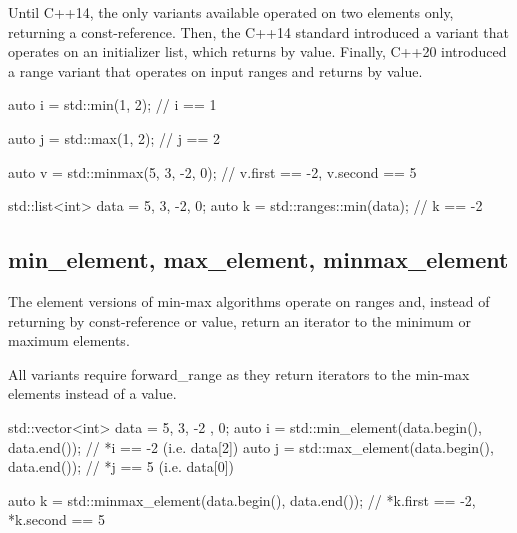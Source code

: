 

Until C++14, the only variants available operated on two elements only, returning a const-reference. Then, the C++14 standard introduced a variant that operates on an initializer list, which returns by value. Finally, C++20 introduced a range variant that operates on input ranges and returns by value.

\begin{box-note}
\begin{cppcode}
auto i = std::min(1, 2);
// i == 1

auto j = std::max(1, 2);
// j == 2

auto v = std::minmax({5, 3, -2, 0});
// v.first == -2, v.second == 5

std::list<int> data = {5, 3, -2, 0};
auto k = std::ranges::min(data);
// k == -2
\end{cppcode}
\end{box-note}

\subsection{min\_element, max\_element, minmax\_element}

The element versions of min-max algorithms operate on ranges and, instead of returning by const-reference or value, return an iterator to the minimum or maximum elements.



All variants require forward\_range as they return iterators to the min-max elements instead of a value.

\begin{box-note}
\begin{cppcode}
std::vector<int> data = { 5, 3, -2 , 0};
auto i = std::min_element(data.begin(), data.end());
// *i == -2 (i.e. data[2])
auto j = std::max_element(data.begin(), data.end());
// *j == 5 (i.e. data[0])

auto k = std::minmax_element(data.begin(), data.end());
// *k.first == -2, *k.second == 5
\end{cppcode}
\end{box-note}